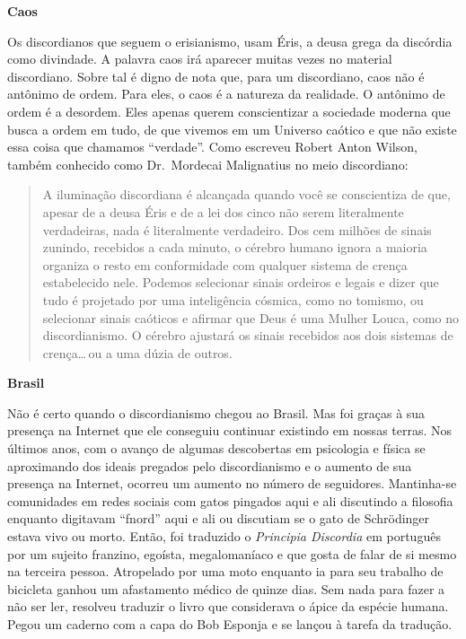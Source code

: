 \newpage
\begin{flushleft}
{\Large \textbf{Caos}}
\end{flushleft}

Os discordianos que seguem o erisianismo, usam Éris, a deusa grega da discórdia como divindade. A palavra caos irá aparecer muitas vezes no material discordiano. Sobre tal é digno de nota que, para um discordiano, caos não é antônimo de ordem. Para eles, o caos é a natureza da realidade. O antônimo de ordem é a desordem. Eles apenas querem conscientizar a sociedade moderna que busca a ordem em tudo, de que vivemos em um Universo caótico e que não existe essa coisa que chamamos ``verdade''. Como escreveu Robert Anton Wilson, também conhecido como Dr.~Mordecai Malignatius no meio discordiano:

	\begin{quote}
	{\small
	A iluminação discordiana é alcançada quando você se conscientiza de que, apesar de a deusa Éris e de a lei dos cinco não serem literalmente verdadeiras, nada é literalmente verdadeiro. Dos cem milhões de sinais zunindo, recebidos a cada minuto, o cérebro humano ignora a maioria organiza o resto em conformidade com qualquer sistema de crença estabelecido nele. Podemos selecionar sinais ordeiros e legais e dizer que tudo é projetado por uma inteligência cósmica, como no tomismo, ou selecionar sinais caóticos e afirmar que Deus é uma Mulher Louca, como no discordianismo. O cérebro ajustará os sinais recebidos aos dois sistemas de crença\ldots\,ou a uma dúzia de outros.}
	\end{quote}
 
\begin{flushleft}
{\Large \textbf{Brasil}}
\end{flushleft}

Não é certo quando o discordianismo chegou ao Brasil. Mas foi graças à sua presença na Internet que ele conseguiu continuar existindo em nossas terras. Nos últimos anos, com o avanço de algumas descobertas em psicologia e física se aproximando dos ideais pregados pelo discordianismo e o aumento de sua presença na Internet, ocorreu um aumento no número de seguidores.  Mantinha-se comunidades em redes sociais com gatos pingados aqui e ali discutindo a filosofia enquanto digitavam ``fnord'' aqui e ali ou discutiam se o gato de Schrödinger estava vivo ou morto. Então, foi traduzido o \emph{Principia Discordia} em português por um sujeito franzino, egoísta, megalomaníaco e que gosta de falar de si mesmo na terceira pessoa. Atropelado por uma moto enquanto ia para seu trabalho de bicicleta ganhou um afastamento médico de quinze dias. Sem nada para fazer a não ser ler, resolveu traduzir o livro que considerava o ápice da espécie humana. Pegou um caderno com a capa do Bob Esponja e se lançou à tarefa da tradução.

